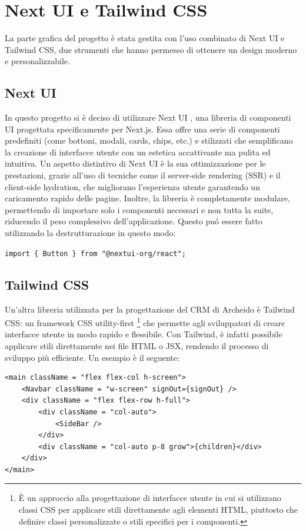 \documentclass[target=bach,aauheader=,style=]{thud}
\begin{document}
\section{Next UI e Tailwind CSS}
La parte grafica del progetto è stata gestita con l'uso combinato di Next UI e Tailwind CSS, due strumenti che hanno permesso di ottenere un design moderno e personalizzabile.

\subsection{Next UI}
In questo progetto si è deciso di utilizzare Next UI \cite{nextui2024}, una libreria di componenti UI progettata specificamente per Next.js. Essa offre una serie di componenti predefiniti (come bottoni, modali, cards, chips, etc.) e stilizzati che semplificano la creazione di interfacce utente con un estetica accattivante ma pulita ed intuitiva. Un aspetto distintivo di Next UI è la sua ottimizzazione per le prestazioni, grazie all'uso di tecniche come il server-side rendering (SSR) e il client-side hydration, che migliorano l'esperienza utente garantendo un caricamento rapido delle pagine. Inoltre, la libreria è completamente modulare, permettendo di importare solo i componenti necessari e non tutta la suite, riducendo il peso complessivo dell'applicazione. Questo puó essere fatto utilizzando la destrutturazione in questo modo:

\begin{center}
    \texttt{import \{ Button \} from "@nextui-org/react";}
\end{center}

\subsection{Tailwind CSS}
\noindent Un'altra libreria utilizzata per la progettazione del CRM di Archeido è Tailwind CSS: un framework CSS utility-first \footnote{È un approccio alla progettazione di interfacce utente in cui si utilizzano classi CSS per applicare stili direttamente agli elementi HTML, piuttosto che definire classi personalizzate o stili specifici per i componenti.} che permette agli sviluppatori di creare interfacce utente in modo rapido e flessibile. Con Tailwind, è infatti possibile applicare stili direttamente nei file HTML o JSX, rendendo il processo di sviluppo più efficiente. Un esempio è il seguente:

\begin{lstlisting}[caption=Parte del file \texttt{app.tsx} del CRM]
<main className = "flex flex-col h-screen">
    <Navbar className = "w-screen" signOut={signOut} />
    <div className = "flex flex-row h-full">
        <div className = "col-auto">
            <SideBar />
        </div>
        <div className = "col-auto p-8 grow">{children}</div>
    </div>
</main> 
\end{lstlisting}
\end{document}
